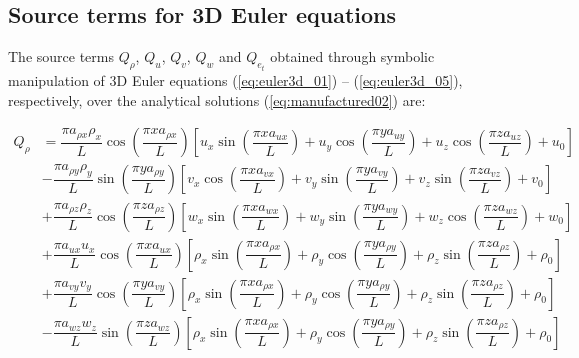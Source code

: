 \documentclass[10pt]{article}
\begin{document}
\begin{landscape}



\section{Source terms for 3D Euler equations}

 The source terms $Q_{\rho}$, $Q_u$, $Q_v$, $Q_w$ and $Q_{e_t}$ obtained through symbolic manipulation of 3D Euler equations (\ref{eq:euler3d_01}) -- (\ref{eq:euler3d_05}), respectively, over the analytical solutions (\ref{eq:manufactured02}) are: %
 



\begin{equation}
 \begin{split}
Q_{\rho} &= \dfrac{ \pi a_{\rho x} \rho_{x} }{L} \cos \left( \dfrac{ \pi x a_{\rho x}}{L}\right)\left[ u_{x} \sin \left( \dfrac{ \pi x a_{u x}}{L}\right) +u_{y} \cos \left( \dfrac{ \pi y a_{u y}}{L}\right) +u_{z} \cos \left( \dfrac{ \pi z a_{u z}}{L}\right) +u_{0}\right]   \\
&- \dfrac{ \pi a_{\rho y} \rho_{y} }{L} \sin \left( \dfrac{ \pi y a_{\rho y}}{L}\right) \left[ v_{x} \cos \left( \dfrac{ \pi x a_{v x}}{L}\right) +v_{y} \sin \left( \dfrac{ \pi y a_{v y}}{L}\right) +v_{z} \sin \left( \dfrac{ \pi z a_{v z}}{L}\right) +v_{0}\right] \\
&+\dfrac{ \pi a_{\rho z} \rho_{z}}{L}  \cos \left( \dfrac{ \pi z a_{\rho z}}{L}\right)\left[ w_{x} \sin \left( \dfrac{ \pi x a_{w x}}{L}\right) +w_{y} \sin \left( \dfrac{ \pi y a_{w y}}{L}\right) +w_{z} \cos \left( \dfrac{ \pi z a_{w z}}{L}\right) +w_{0}\right]   \\
&+ \dfrac{ \pi a_{u x} u_{x} }{L} \cos \left( \dfrac{ \pi x a_{u x}}{L}\right) \left[ \rho_{x} \sin \left( \dfrac{ \pi x a_{\rho x}}{L}\right) +\rho_{y} \cos \left( \dfrac{ \pi y a_{\rho y}}{L}\right) +\rho_{z} \sin \left( \dfrac{ \pi z a_{\rho z}}{L}\right) +\rho_{0}\right] \\
&+ \dfrac{ \pi a_{v y} v_{y} }{L} \cos \left( \dfrac{ \pi y a_{v y}}{L}\right) \left[ \rho_{x} \sin \left( \dfrac{ \pi x a_{\rho x}}{L}\right) +\rho_{y} \cos \left( \dfrac{ \pi y a_{\rho y}}{L}\right) +\rho_{z} \sin \left( \dfrac{ \pi z a_{\rho z}}{L}\right) +\rho_{0}\right]  \\
&-\dfrac{ \pi a_{w z} w_{z}}{L}  \sin \left( \dfrac{ \pi z a_{w z}}{L}\right)\left[ \rho_{x} \sin \left( \dfrac{ \pi x a_{\rho x}}{L}\right) +\rho_{y} \cos \left( \dfrac{ \pi y a_{\rho y}}{L}\right) +\rho_{z} \sin \left( \dfrac{ \pi z a_{\rho z}}{L}\right) +\rho_{0}\right]
 \end{split}
\end{equation}


\end{landscape}
\end{document}
